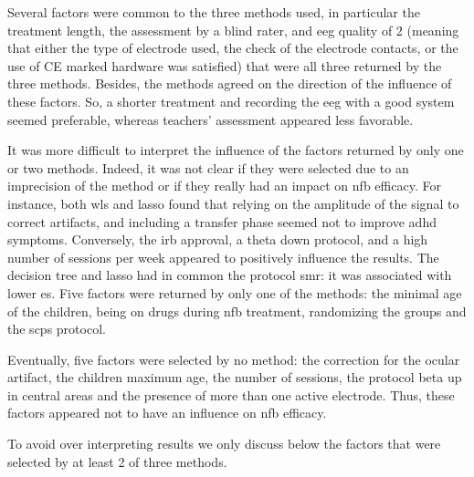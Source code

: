 Several factors were common to the three methods used, in particular the treatment length, the assessment 
by a blind rater, and \gls{eeg} quality of 2 (meaning that either the type of electrode used, the check of the electrode 
contacts, or the use of CE marked hardware was satisfied) that were all three returned by the three methods. Besides, 
the methods agreed on the direction of the influence of these factors. So, a shorter treatment and recording the \gls{eeg} 
with a good system seemed preferable, whereas teachers' assessment appeared less favorable.

It was more difficult to interpret the influence of the factors returned by only one or two methods. Indeed, it was not clear 
if they were selected due to an imprecision of the method or if they really had an impact on \gls{nfb} efficacy. For instance, 
both \gls{wls} and \gls{lasso} found that relying on the amplitude of the signal to correct artifacts, and including a transfer 
phase seemed not to improve \gls{adhd} symptoms. Conversely, the \gls{irb} approval, a theta down protocol, and a high number 
of sessions per week appeared to positively influence the results. The decision tree and \gls{lasso} had in common the protocol 
\gls{smr}: it was associated with lower \gls{es}. Five factors were returned by only one of the methods: the minimal age of the 
children, being on drugs during \gls{nfb} treatment, randomizing the groups and the \glspl{scp} protocol.  

Eventually, five factors were selected by no method: the correction for the ocular artifact, the children maximum age, the number 
of sessions, the protocol beta up in central areas and the presence of more than one active electrode. Thus, these factors appeared 
not to have an influence on \gls{nfb} efficacy.  

To avoid over interpreting results we only discuss below the factors that were selected by at least 2 of three methods. 

